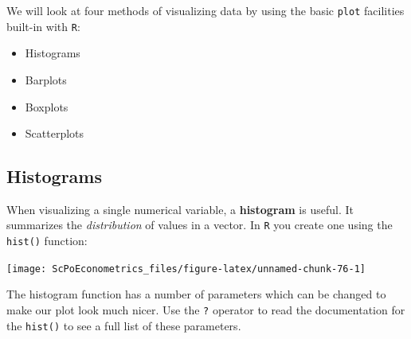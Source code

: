 \documentclass[]{book}
\newenvironment{Shaded}{\begin{snugshade}}{\end{snugshade}}
\newcommand{\CommentTok}[1]{\textcolor[rgb]{0.56,0.35,0.01}{\textit{#1}}}
\newcommand{\DataTypeTok}[1]{\textcolor[rgb]{0.13,0.29,0.53}{#1}}
\newcommand{\DecValTok}[1]{\textcolor[rgb]{0.00,0.00,0.81}{#1}}
\newcommand{\KeywordTok}[1]{\textcolor[rgb]{0.13,0.29,0.53}{\textbf{#1}}}
\newcommand{\NormalTok}[1]{#1}
\newcommand{\OperatorTok}[1]{\textcolor[rgb]{0.81,0.36,0.00}{\textbf{#1}}}
\newcommand{\StringTok}[1]{\textcolor[rgb]{0.31,0.60,0.02}{#1}}
\providecommand{\tightlist}{%
  \setlength{\itemsep}{0pt}\setlength{\parskip}{0pt}}
\begin{document}
We will look at four methods of visualizing data by using the basic \texttt{plot} facilities built-in with \texttt{R}:

\begin{itemize}
\tightlist
\item
  Histograms
\item
  Barplots
\item
  Boxplots
\item
  Scatterplots
\end{itemize}

\hypertarget{histograms}{%
\subsection{Histograms}\label{histograms}}

When visualizing a single numerical variable, a \textbf{histogram} is useful. It summarizes the \emph{distribution} of values in a vector. In \texttt{R} you create one using the \texttt{hist()} function:

\begin{Shaded}
\end{Shaded}

\begin{center}\texttt{[image: ScPoEconometrics\_files/figure-latex/unnamed-chunk-76-1]} \end{center}

The histogram function has a number of parameters which can be changed to make our plot look much nicer. Use the \texttt{?} operator to read the documentation for the \texttt{hist()} to see a full list of these parameters.

\begin{Shaded}
\end{Shaded}
\end{document}

